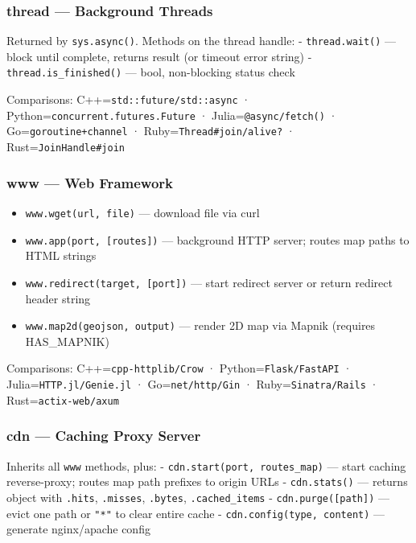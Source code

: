 \documentclass[
]{article}
\providecommand{\tightlist}{%
  \setlength{\itemsep}{0pt}\setlength{\parskip}{0pt}}
\begin{document}
\subsubsection{thread --- Background
Threads}\label{thread-background-threads}

Returned by \texttt{sys.async()}. Methods on the thread handle: -
\texttt{thread.wait()} --- block until complete, returns result (or
timeout error string) - \texttt{thread.is\_finished()} --- bool,
non-blocking status check

Comparisons: C++=\texttt{std::future/std::async} ·
Python=\texttt{concurrent.futures.Future} ·
Julia=\texttt{@async/fetch()} · Go=\texttt{goroutine+channel} ·
Ruby=\texttt{Thread\#join/alive?} · Rust=\texttt{JoinHandle\#join}

\subsubsection{www --- Web Framework}\label{www-web-framework}

\begin{itemize}
\tightlist
\item
  \texttt{www.wget(url,\ file)} --- download file via curl
\item
  \texttt{www.app(port,\ {[}routes{]})} --- background HTTP server;
  routes map paths to HTML strings
\item
  \texttt{www.redirect(target,\ {[}port{]})} --- start redirect server
  or return redirect header string
\item
  \texttt{www.map2d(geojson,\ output)} --- render 2D map via Mapnik
  (requires HAS\_MAPNIK)
\end{itemize}

Comparisons: C++=\texttt{cpp-httplib/Crow} ·
Python=\texttt{Flask/FastAPI} · Julia=\texttt{HTTP.jl/Genie.jl} ·
Go=\texttt{net/http/Gin} · Ruby=\texttt{Sinatra/Rails} ·
Rust=\texttt{actix-web/axum}

\subsubsection{cdn --- Caching Proxy
Server}\label{cdn-caching-proxy-server}

Inherits all \texttt{www} methods, plus: -
\texttt{cdn.start(port,\ routes\_map)} --- start caching reverse-proxy;
routes map path prefixes to origin URLs - \texttt{cdn.stats()} ---
returns object with \texttt{.hits}, \texttt{.misses}, \texttt{.bytes},
\texttt{.cached\_items} - \texttt{cdn.purge({[}path{]})} --- evict one
path or \texttt{"*"} to clear entire cache -
\texttt{cdn.config(type,\ content)} --- generate nginx/apache config
\end{document}
